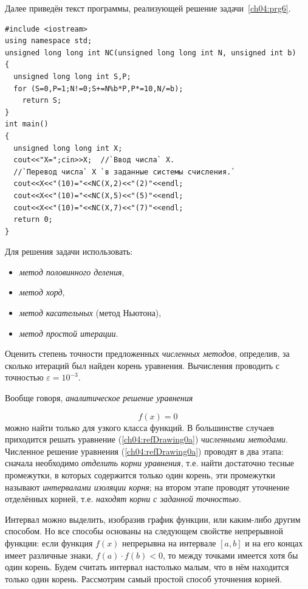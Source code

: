 Далее приведён текст программы, реализующей решение задачи~\ref{ch04:prg6}.

\begin{lstlisting}
#include <iostream>
using namespace std;
unsigned long long int NC(unsigned long long int N, unsigned int b)
{
  unsigned long long int S,P;
  for (S=0,P=1;N!=0;S+=N%b*P,P*=10,N/=b);
    return S;
}
int main()
{
  unsigned long long int X;
  cout<<"X=";cin>>X;  //`Ввод числа` X.
  //`Перевод числа` X `в заданные системы счисления.`
  cout<<X<<"(10)="<<NC(X,2)<<"(2)"<<endl;
  cout<<X<<"(10)="<<NC(X,5)<<"(5)"<<endl;
  cout<<X<<"(10)="<<NC(X,7)<<"(7)"<<endl;
  return 0;
}
\end{lstlisting}


Для
решения задачи использовать:
\begin{itemize}
\item \emph{метод половинного деления},
\item \emph{метод хорд},
\item \emph{метод касательных} (метод Ньютона),
\item \emph{метод простой итерации}.
\end{itemize}
Оценить степень точности предложенных \emph{численных методов}, определив, за сколько итераций был найден
корень уравнения. Вычисления проводить с точностью  $\varepsilon=10^{-3}$.

Вообще говоря, \emph{аналитическое решение уравнения}

\begin{equation}\label{ch04:refDrawing0a}
f(x)=0
\end{equation}
можно найти только для узкого класса функций. В большинстве случаев приходится решать уравнение (\ref{ch04:refDrawing0a})
\emph{численными методами}. Численное решение уравнения (\ref{ch04:refDrawing0a}) проводят в два этапа: сначала
необходимо \emph{отделить корни уравнения}, т.е. найти достаточно тесные промежутки, в которых содержится
только один корень, эти промежутки называют \emph{интервалами изоляции корня}; на втором этапе проводят
уточнение отделённых корней, т.е. \emph{находят корни с заданной точностью}.

Интервал можно выделить, изобразив график функции, или каким-либо другим способом. Но все способы основаны на следующем
свойстве непрерывной функции: если функция  $f(x)$  непрерывна на интервале  $[a,b]$ и на его концах имеет различные
знаки,  $f(a)\cdot f(b)<0$, то между точками имеется хотя бы один корень. Будем считать интервал настолько малым, что в
нём находится только один корень. Рассмотрим самый простой способ уточнения корней.

